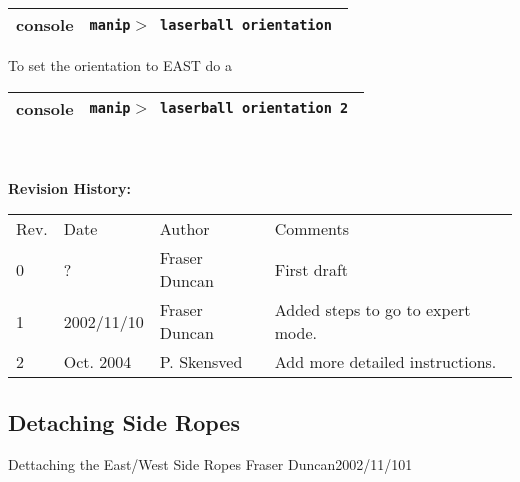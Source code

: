 \begin{enumerate}
\begin{center}
\begin{tabular}{|l|l|}
\hline
console & {  \tt manip$>$ laserball orientation }\\

\hline
\end{tabular}
\end{center}

 To set the orientation to EAST do a 

\begin{center}
\begin{tabular}{|l|l|}
\hline
console & {  \tt manip$>$ laserball orientation 2 }\\

\hline
\end{tabular}

\end{center}


\end{enumerate}




{\small
~\\
~\\
\noindent
{\bf Revision History:}\\
\begin{tabular}{llll}
Rev. & Date & Author & Comments\\
0           &  ?  & Fraser Duncan &
\parbox[t]{3.0in}{
  First draft
}\\

1             & 2002/11/10    & Fraser Duncan &
\parbox[t]{3.0in}{
  Added steps to go to expert mode.
}\\

2                & Oct. 2004 & P. Skensved &
\parbox[t]{3.0in}{
  Add more detailed instructions. 
} \\

\end{tabular}
}

 




\newpage
\subsection{Detaching Side Ropes}
             {Dettaching the East/West Side Ropes}
             {Fraser Duncan}{2002/11/10}{1}

